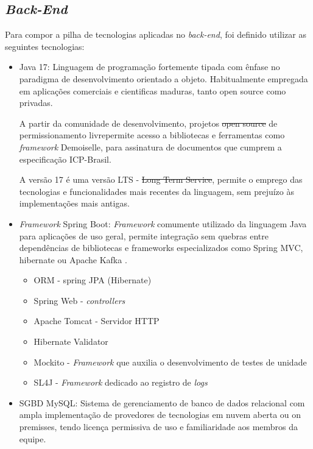\documentclass[
    12pt,               %
    openright,          %
    oneside,
    a4paper,            %
    BIBLATEX,           %
    TODO,               %
    english,            %
    brazil              %
    ]{ifsp-spo-inf-ctds}
\providecommand{\DIFadd}[1]{{\protect\color{blue}\uwave{#1}}} %
\providecommand{\DIFdel}[1]{{\protect\color{red}\sout{#1}}}                      %
\providecommand{\DIFaddbegin}{} %
\providecommand{\DIFaddend}{} %
\providecommand{\DIFdelbegin}{} %
\providecommand{\DIFdelend}{} %
\newcommand{\DIFscaledelfig}{0.5}
\newlength{\DIFdelgraphicswidth} %
\newlength{\DIFdelgraphicsheight} %
\newcommand{\DIFaddincludegraphics}[2][]{{\color{blue}\fbox{\DIFOincludegraphics[#1]{#2}}}} %
\newcommand{\DIFdelincludegraphics}[2][]{%
\sbox{\DIFdelgraphicsbox}{\DIFOincludegraphics[#1]{#2}}%
\settoboxwidth{\DIFdelgraphicswidth}{\DIFdelgraphicsbox} %
\settoboxtotalheight{\DIFdelgraphicsheight}{\DIFdelgraphicsbox} %
\scalebox{\DIFscaledelfig}{%
\parbox[b]{\DIFdelgraphicswidth}{\usebox{\DIFdelgraphicsbox}\\[-\baselineskip] \rule{\DIFdelgraphicswidth}{0em}}\llap{\resizebox{\DIFdelgraphicswidth}{\DIFdelgraphicsheight}{%
\setlength{\unitlength}{\DIFdelgraphicswidth}%
\begin{picture}(1,1)%
\thicklines\linethickness{2pt} %
{\color[rgb]{1,0,0}\put(0,0){\framebox(1,1){}}}%
{\color[rgb]{1,0,0}\put(0,0){\line( 1,1){1}}}%
{\color[rgb]{1,0,0}\put(0,1){\line(1,-1){1}}}%
\end{picture}%
}\hspace*{3pt}}} %
} %
\DeclareRobustCommand{\DIFaddbegin}{\DIFOaddbegin \let\includegraphics\DIFaddincludegraphics} %
\DeclareRobustCommand{\DIFaddend}{\DIFOaddend \let\includegraphics\DIFOincludegraphics} %
\DeclareRobustCommand{\DIFdelbegin}{\DIFOdelbegin \let\includegraphics\DIFdelincludegraphics} %
\DeclareRobustCommand{\DIFdelend}{\DIFOaddend \let\includegraphics\DIFOincludegraphics} %
\begin{document}
        \subsection{\emph{Back-End}}
        \DIFaddbegin \label{subcap:tecnologia-backend}
    \DIFaddend 

            Para compor a pilha de tecnologias aplicadas no \emph{back-end}, foi definido utilizar as seguintes tecnologias:

            \begin{itemize}
                \item Java 17: 
                    Linguagem de programação fortemente tipada com ênfase no paradigma de desenvolvimento orientado a objeto. Habitualmente empregada em aplicações comerciais e cientificas maduras, tanto open source como privadas.

                    A partir da comunidade de desenvolvimento, projetos \DIFdelbegin \DIFdel{open source }\DIFdelend \DIFaddbegin \emph{\DIFadd{open source}} \DIFaddend de permissionamento livre\DIFaddbegin \DIFadd{, }\DIFaddend permite acesso a bibliotecas e ferramentas como \emph{framework} Demoiselle, para assinatura de documentos que cumprem a especificação ICP-Brasil.

                    A versão 17 é uma versão LTS - \DIFdelbegin \DIFdel{Long Term Service}\DIFdelend \DIFaddbegin \emph{\DIFadd{Long Term Service}}\DIFaddend , permite o emprego das tecnologias e funcionalidades mais recentes da linguagem, sem prejuízo às implementações mais antigas.

                \item \emph{Framework} Spring Boot: 
                   \emph{ Framework} comumente utilizado da linguagem Java para aplicações de uso geral, permite integração sem quebras entre dependências de bibliotecas e frameworks especializados como Spring MVC, hibernate ou Apache Kafka .
                    \begin{itemize}
                        \item ORM - spring JPA (Hibernate)
                        \item Spring Web - \emph{controllers}
                        \item Apache Tomcat - Servidor HTTP
                        \item Hibernate Validator
                        \item Mockito - \emph{Framework} que auxilia o desenvolvimento de testes de unidade
                        \item SL4J - \emph{Framework} dedicado ao registro de \emph{logs}
                    \end{itemize}
                \item SGBD MySQL:
                    Sistema de gerenciamento de banco de dados relacional com ampla implementação de provedores de tecnologias em nuvem aberta ou on premisses, tendo licença permissiva de uso e familiaridade aos membros da equipe.


\end{itemize}
\end{document}
